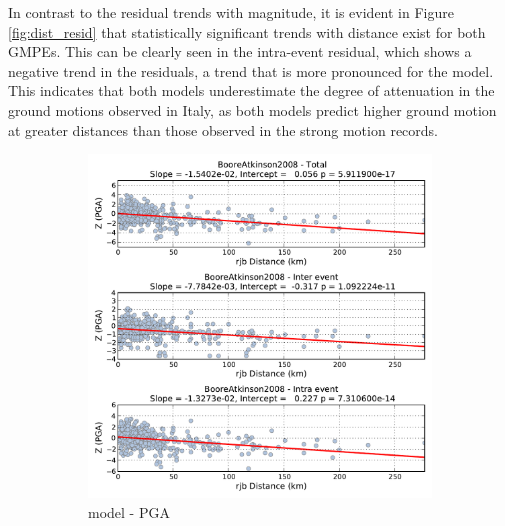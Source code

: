 In contrast to the residual trends with magnitude, it is evident in Figure \ref{fig:dist_resid} that statistically significant trends with distance exist for both GMPEs. This can be clearly seen in the intra-event residual, which shows a negative trend in the residuals, a trend that is more pronounced for the \textcite{boore2008} model. This indicates that both models underestimate the degree of attenuation in the ground motions observed in Italy, as both models predict higher ground motion at greater distances than those observed in the strong motion records. 

\begin{figure}[htb]
  \centering
  \begin{subfigure}[b]{0.49\textwidth}
      \includegraphics[width=\textwidth]{./figures/residuals/BA2008_Distance_PGA.pdf}
      \caption{\textcite{boore2008} model - PGA}
      \label{fig:pga_dist_ba2008}
  \end{subfigure}
    \begin{subfigure}[b]{0.49\textwidth}

\end{subfigure}
\end{figure}
